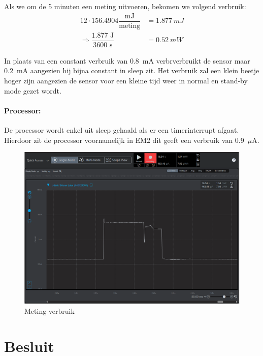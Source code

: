 \documentclass[]{article}
\begin{document}
Als we om de 5 minuten een meting uitvoeren, bekomen we volgend verbruik:
\begin{align*}
	12\cdot 156.4904 \dfrac{\text{mJ}}{\text{meting}} &=  \SI{1.877}{mJ} \\
	\Rightarrow \dfrac{1.877\text{ J}}{3600\text{ s}} &= \SI{0.52}{mW}
\end{align*}




In plaats van een constant verbruik van 0.8~mA verbrverbruikt de sensor maar 0.2~mA aangezien hij bijna constant in sleep zit. Het verbruik zal een klein beetje hoger zijn aangezien de sensor voor een kleine tijd weer in normal en stand-by mode gezet wordt. 
\paragraph{Processor: }
De processor wordt enkel uit sleep gehaald als er een timerinterrupt afgaat. Hierdoor zit de processor voornamelijk in EM2 dit geeft een verbruik van 0.9~$\mu$A.


\begin{figure}[h!]
	\centering
	\includegraphics[width=\columnwidth]{final_energy_consumption.png}
	\caption{Meting verbruik}
	\label{fig:meting}
\end{figure}





\newpage
\section{Besluit }
\end{document}
